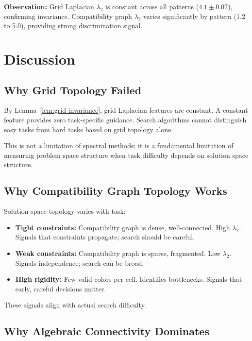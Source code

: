 \documentclass[11pt]{article}
\begin{document}
\textbf{Observation:} Grid Laplacian $\lambda_2$ is constant across all patterns ($4.1 \pm 0.02$), confirming invariance. Compatibility graph $\lambda_2$ varies significantly by pattern (1.2 to 5.0), providing strong discrimination signal.

\section{Discussion}

\subsection{Why Grid Topology Failed}

By Lemma~\ref{lem:grid-invariance}, grid Laplacian features are constant. A constant feature provides zero task-specific guidance. Search algorithms cannot distinguish easy tasks from hard tasks based on grid topology alone.

This is not a limitation of spectral methods; it is a fundamental limitation of measuring problem space structure when task difficulty depends on solution space structure.

\subsection{Why Compatibility Graph Topology Works}

Solution space topology varies with task:

\begin{itemize}
\item \textbf{Tight constraints:} Compatibility graph is dense, well-connected. High $\lambda_2$. Signals that constraints propagate; search should be careful.

\item \textbf{Weak constraints:} Compatibility graph is sparse, fragmented. Low $\lambda_2$. Signals independence; search can be broad.

\item \textbf{High rigidity:} Few valid colors per cell. Identifies bottlenecks. Signals that early, careful decisions matter.
\end{itemize}

These signals align with actual search difficulty.

\subsection{Why Algebraic Connectivity Dominates}
\end{document}
